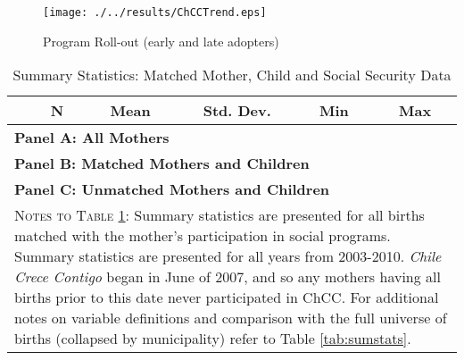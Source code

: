 \documentclass[12pt]{article}
\begin{document}
\begin{spacing}{1.4}
\begin{figure}[htpb!]
  \begin{center}
    \centering
    \caption{Program Roll-out (early and late adopters)}
    \texttt{[image: ./../results/ChCCTrend.eps]}
    \label{fig:trends}
  \end{center}
  \vspace{-5mm}
\end{figure}

\begin{table}[htpb!]
  \begin{center}
    \caption{Summary Statistics: Matched Mother, Child and Social Security Data}
    \label{tab:sumstatsMother}
    \begin{tabular}{lccccc} \toprule
      & N& Mean & Std. Dev. & Min & Max \\ \midrule
      \multicolumn{6}{l}{\textbf{Panel A: All Mothers}} \\
      
      \multicolumn{6}{l}{\textbf{Panel B: Matched Mothers and Children}} \\
      
      \multicolumn{6}{l}{\textbf{Panel C: Unmatched Mothers and Children}} \\
      
      \bottomrule
      \multicolumn{6}{p{15.4cm}}{{\footnotesize \textsc{Notes to Table \ref{tab:sumstatsMother}}:
          Summary statistics are presented for all births matched with the mother's participation
          in social programs. Summary statistics are presented for all years from 2003-2010.
          \emph{Chile Crece Contigo} began in June of 2007, and so any mothers having all births
          prior to this date never participated in ChCC.  For additional notes on variable definitions
          and comparison with the full universe of births (collapsed by municipality) refer to Table
      \ref{tab:sumstats}.}}
      \end{tabular}
  \end{center}
\end{table}



\end{spacing}
\end{document}
